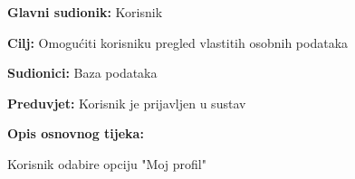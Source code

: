 					\noindent {}
					\begin{packed_item}
						
						\item \textbf{Glavni sudionik: }Korisnik
						\item  \textbf{Cilj:} Omogućiti korisniku pregled vlastitih osobnih podataka
						\item  \textbf{Sudionici:} Baza podataka
						\item  \textbf{Preduvjet:} Korisnik je prijavljen u sustav
						\item  \textbf{Opis osnovnog tijeka:}
						
						\item[] \begin{packed_enum}
							
							\item Korisnik odabire opciju "Moj profil"
					
						\end{packed_enum}
						
					\end{packed_item}
				

